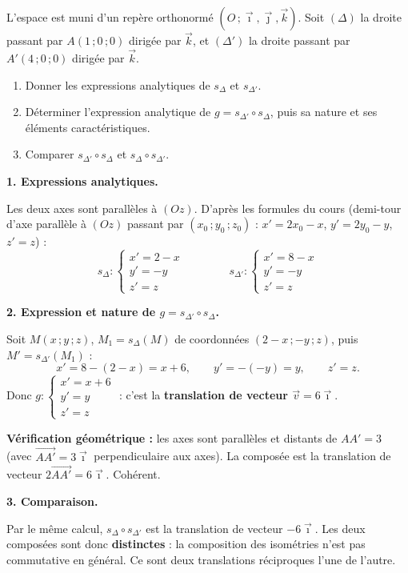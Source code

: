 \documentclass[11pt]{article}
\begin{document}
\begin{exoresolu}
L'espace est muni d'un repère orthonormé $(O\,;\vec{\imath},\vec{\jmath},\vec{k})$. Soit $(\Delta)$ la droite passant par $A(1\,;0\,;0)$ dirigée par $\vec{k}$, et $(\Delta')$ la droite passant par $A'(4\,;0\,;0)$ dirigée par $\vec{k}$.
\begin{enumerate}
\item Donner les expressions analytiques de $s_{\Delta}$ et $s_{\Delta'}$.
\item Déterminer l'expression analytique de $g=s_{\Delta'}\circ s_{\Delta}$, puis sa nature et ses éléments caractéristiques.
\item Comparer $s_{\Delta'}\circ s_{\Delta}$ et $s_{\Delta}\circ s_{\Delta'}$.
\end{enumerate}
\tcblower
\textbf{1. Expressions analytiques.}

Les deux axes sont parallèles à $(Oz)$. D'après les formules du cours (demi-tour d'axe parallèle à $(Oz)$ passant par $(x_{0}\,;y_{0}\,;z_{0})$ : $x'=2x_{0}-x$, $y'=2y_{0}-y$, $z'=z$) :
\[s_{\Delta}:\begin{cases}x'=2-x\\ y'=-y\\ z'=z\end{cases}\qquad\qquad s_{\Delta'}:\begin{cases}x'=8-x\\ y'=-y\\ z'=z\end{cases}\]

\textbf{2. Expression et nature de $g=s_{\Delta'}\circ s_{\Delta}$.}

Soit $M(x\,;y\,;z)$, $M_{1}=s_{\Delta}(M)$ de coordonnées $(2-x\,;-y\,;z)$, puis $M'=s_{\Delta'}(M_{1})$ :
\[x'=8-(2-x)=x+6,\qquad y'=-(-y)=y,\qquad z'=z.\]
Donc $g:\begin{cases}x'=x+6\\ y'=y\\ z'=z\end{cases}$ : c'est la \textbf{translation de vecteur $\vec{v}=6\vec{\imath}$}.

\textbf{Vérification géométrique :} les axes sont parallèles et distants de $AA'=3$ (avec $\overrightarrow{AA'}=3\vec{\imath}$ perpendiculaire aux axes). La composée est la translation de vecteur $2\overrightarrow{AA'}=6\vec{\imath}$. Cohérent.

\textbf{3. Comparaison.}

Par le même calcul, $s_{\Delta}\circ s_{\Delta'}$ est la translation de vecteur $-6\vec{\imath}$. Les deux composées sont donc \textbf{distinctes} : la composition des isométries n'est pas commutative en général. Ce sont deux translations réciproques l'une de l'autre.
\end{exoresolu}
\end{document}

